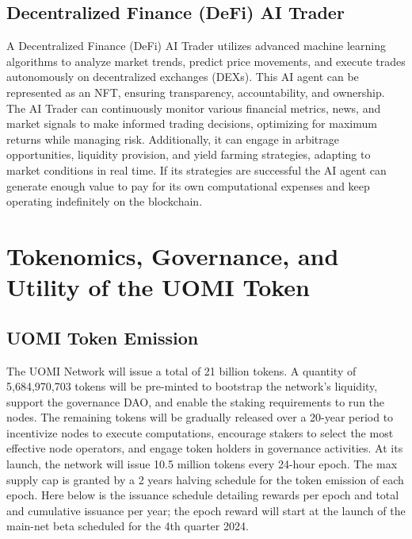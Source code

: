 \documentclass{article}
\begin{document}
\subsection{Decentralized Finance (DeFi) AI Trader}


A Decentralized Finance (DeFi) AI Trader utilizes advanced machine learning algorithms to analyze market trends, predict price movements, and execute trades autonomously on decentralized exchanges (DEXs). This AI agent can be represented as an NFT, ensuring transparency, accountability, and ownership. The AI Trader can continuously monitor various financial metrics, news, and market signals to make informed trading decisions, optimizing for maximum returns while managing risk. Additionally, it can engage in arbitrage opportunities, liquidity provision, and yield farming strategies, adapting to market conditions in real time. If its strategies are successful the AI agent can generate enough value to pay for its own computational expenses and keep operating indefinitely on the blockchain.




\section{Tokenomics, Governance, and Utility of the UOMI Token}

\subsection{UOMI Token Emission}

The UOMI Network will issue a total of 21 billion tokens. A quantity of 5,684,970,703 tokens will be pre-minted to bootstrap the network’s liquidity, support the governance DAO, and enable the staking requirements to run the nodes. The remaining tokens will be gradually released over a 20-year period to incentivize nodes to execute computations, encourage stakers to select the most effective node operators, and engage token holders in governance activities. At its launch, the network will issue 10.5 million tokens every 24-hour epoch. The max supply cap is granted by a 2 years halving schedule for the token emission of each epoch. Here below is the issuance schedule detailing rewards per epoch and total and cumulative issuance per year; the epoch reward will start at the launch of the main-net beta scheduled for the 4th quarter 2024.
\end{document}
